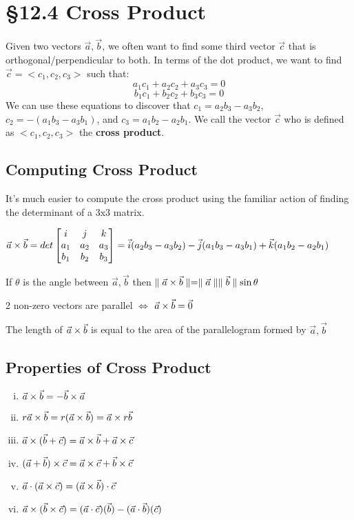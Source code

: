 \documentclass[12 pt]{article}
\begin{document}
	\section{\S 12.4 Cross Product}
		Given two vectors $\vec{a},\vec{b}$, we often want to find some third vector $\vec{c}$ that is orthogonal/perpendicular to both. In terms of the dot product, we want to find $\vec{c}=<c_1,c_2,c_3>$ such that:
		$$a_1c_1+a_2c_2+a_3c_3=0$$
		$$b_1c_1+b_2c_2+b_3c_3=0$$
		We can use these equations to discover that $c_1=a_2b_3-a_3b_2$, $c_2=-(a_1b_3-a_3b_1)$, and $c_3=a_1b_2-a_2b_1$. We call the vector $\vec{c}$ who is defined as $<c_1,c_2,c_3>$ the \textbf{cross product}.

		\subsection{Computing Cross Product}

		It's much easier to compute the cross product using the familiar action of finding the determinant of a 3x3 matrix.\\
		\begin{center}
		$\vec{a}\times\vec{b}=det
		\begin{bmatrix}
			i & j & k \\
			a_1 & a_2 & a_3 \\
			b_1 & b_2 & b_3
		\end{bmatrix}
		=\vec{i}(a_2b_3-a_3b_2)-\vec{j}(a_1b_3-a_3b_1)+\vec{k}(a_1b_2-a_2b_1)$
		\end{center}
		\begin{thrm}
			If $\theta$ is the angle between $\vec{a}, \vec{b}$ then
			$\parallel \vec{a}\times\vec{b}\parallel=\parallel \vec{a} \parallel\parallel \vec{b} \parallel\sin{\theta}$
		\end{thrm}
		\begin{remark}
			2 non-zero vectors are parallel $\Leftrightarrow$ $\vec{a}\times\vec{b}=\vec{0}$
		\end{remark}
		\begin{remark}
			The length of $\vec{a}\times\vec{b}$ is equal to the area of the parallelogram formed by $\vec{a},\vec{b}$
		\end{remark}

		\subsection{Properties of Cross Product}

		\begin{enumerate}[i)]
			\item $\vec{a}\times\vec{b}=-\vec{b}\times\vec{a}$
			\item $r\vec{a}\times\vec{b}=r(\vec{a}\times\vec{b})=\vec{a}\times r\vec{b}$
			\item $\vec{a}\times (\vec{b}+\vec{c})=\vec{a}\times\vec{b}+\vec{a}\times\vec{c}$
			\item $(\vec{a}+\vec{b})\times\vec{c}=\vec{a}\times\vec{c}+\vec{b}\times\vec{c}$
			\item $\vec{a}\cdot (\vec{a}\times\vec{c})=(\vec{a}\times\vec{b})\cdot \vec{c}$
			\item $\vec{a}\times (\vec{b}\times\vec{c})=(\vec{a}\cdot\vec{c})(\vec{b})-(\vec{a}\cdot\vec{b})(\vec{c})$
		\end{enumerate}
\end{document}
